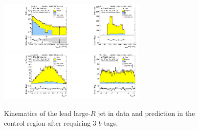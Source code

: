 \clearpage

\begin{figure}[htbp!]
\begin{center}
\includegraphics[width=0.32\textwidth,angle=-90]{figures/boosted/Control/b77_ThreeTag_Control_leadHCand_Pt_m_1.pdf}
\includegraphics[width=0.32\textwidth,angle=-90]{figures/boosted/Control/b77_ThreeTag_Control_leadHCand_Mass_s.pdf}\\
\includegraphics[width=0.32\textwidth,angle=-90]{figures/boosted/Control/b77_ThreeTag_Control_leadHCand_Eta.pdf}
\includegraphics[width=0.32\textwidth,angle=-90]{figures/boosted/Control/b77_ThreeTag_Control_leadHCand_Phi.pdf}
  \caption{Kinematics of the lead large-$R$ jet in data and prediction in the control region after requiring 3 $b$-tags. }
  \label{fig:boosted-3b-control-ak10-lead}
\end{center}
\end{figure}

